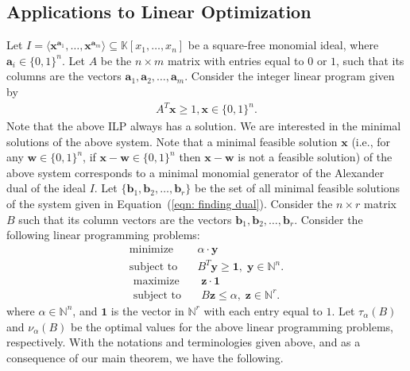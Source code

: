 \documentclass[12pt]{amsart}
\def\K{\mathbb{K}}
\def\l{\langle}
\def\r{\rangle}
\begin{document}
\medskip

\subsection*{Applications to Linear Optimization}

Let $I=\l \mathbf{x}^{\mathbf{a}_1}, \dots , \mathbf{x}^{\mathbf{a}_m}\r\subseteq \K[x_1,\dots , x_n]$ be a square-free monomial ideal, where $\mathbf{a}_i\in \{0,1\}^n$. Let $A$ be the $n\times m$ matrix with entries equal to $0$ or $1$, such that its columns are the vectors $\mathbf{a}_1, \mathbf{a}_2, \dots ,\mathbf{a}_m$. Consider the integer linear program given by
\begin{align}\label{eqn: finding dual}
    A^T\mathbf{x}\geq 1, \mathbf{x}\in \{0,1\}^n.
\end{align}
Note that the above ILP always has a solution. We are interested in the minimal solutions of the above system. Note that a minimal feasible solution $\mathbf{x}$ (i.e., for any $\mathbf{w} \in \{0,1\}^n$, if $\mathbf{x} - \mathbf{w} \in \{0,1\}^n$ then $\mathbf{x} - \mathbf{w}$ is not a feasible solution) of the above system corresponds to a minimal monomial generator of the Alexander dual of the ideal $I$.  Let $\{\mathbf{b}_1, \mathbf{b}_2, \dots ,\mathbf{b}_r\}$ be the set of all minimal feasible solutions of the system given in Equation~(\ref{eqn: finding dual}). Consider the $n\times r$ matrix $B$ such that its column vectors are the vectors $\mathbf{b}_1,\mathbf{b}_2,\dots ,\mathbf{b}_r$. Consider the following linear programming problems:
\begin{equation}
    \tag{3}
    \begin{aligned}
        \text{minimize} \quad & \alpha \cdot \mathbf{y} \\
        \text{subject to} \quad & B^T\mathbf{y} \ge \mathbf{1}, \; \mathbf{y} \in \mathbb{N}^n .
    \end{aligned}
\end{equation}
\begin{equation}
    \tag{4}
    \begin{aligned}
        \text{maximize} \quad & \mathbf{z} \cdot \mathbf{1} \\
        \text{subject to} \quad & B\mathbf{z} \le \alpha, \; \mathbf{z} \in \mathbb{N}^r.
    \end{aligned}
\end{equation}
where $\alpha\in \mathbb{N}^n$, and $\mathbf{1}$ is the vector in $\mathbb{N}^r$ with each entry equal to $1$. Let $\tau_{\alpha}(B)$ and $\nu_{\alpha}(B)$ be the optimal values for the above linear programming problems, respectively. With the notations and terminologies given above, and as a consequence of our main theorem, we have the following.
\end{document}
